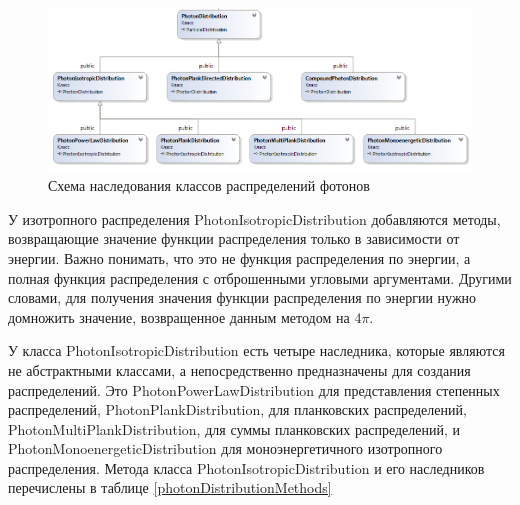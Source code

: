 \begin{figure}
	\centering
	\includegraphics[width=10.5 cm]{./fig/photonDistribution2.png} 
	\caption{Схема наследования классов распределений фотонов}
	\label{photonDistribution}
\end{figure}

У изотропного распределения PhotonIsotropicDistribution добавляются методы, возвращающие значение функции распределения только в зависимости от энергии. Важно понимать, что это не функция распределения по энергии, а полная функция распределения с отброшенными угловыми аргументами. Другими словами, для получения значения функции распределения по энергии нужно домножить значение, возвращенное данным методом на $4 \pi$.

У класса PhotonIsotropicDistribution есть четыре наследника, которые являются не абстрактными классами, а непосредственно предназначены для создания распределений. Это PhotonPowerLawDistribution для представления степенных распределений, PhotonPlankDistribution, для планковских распределений, PhotonMultiPlankDistribution, для суммы планковских распределений, и PhotonMonoenergeticDistribution для моноэнергетичного изотропного распределения. Метода класса PhotonIsotropicDistribution и его наследников перечислены в таблице \ref{photonDistributionMethods}

